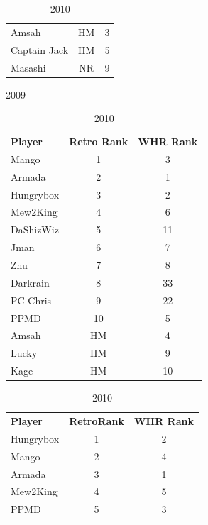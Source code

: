\documentclass[10pt]{article}
\theoremstyle{definition}
\theoremstyle{remark}
\begin{document}
\begin{table}[!ht]
{\begin{tabular}{lcc}
    Amsah           & HM                     & 3        \\
    Captain Jack    & HM                     & 5        \\
    Masashi         & NR                     & 9        \\
\end{tabular}
}
    \parbox{.33 \textwidth}{
        \centering
        \caption{2009}
\begin{tabular}{lcc}
    \textbf{Player} & \textbf{Retro Rank} & \textbf{WHR Rank} \\
    Mango           & 1                      & 3        \\
    Armada          & 2                      & 1        \\
    Hungrybox       & 3                      & 2        \\
    Mew2King        & 4                      & 6        \\
    DaShizWiz       & 5                      & 11       \\
    Jman            & 6                      & 7        \\
    Zhu             & 7                      & 8        \\
    Darkrain        & 8                      & 33       \\
    PC Chris        & 9                      & 22       \\
    PPMD            & 10                     & 5        \\
    Amsah           & HM                     & 4        \\
    Lucky           & HM                     & 9        \\
    Kage            & HM                     & 10       \\
\end{tabular}
}
    \parbox{.33 \textwidth}{
        \centering
        \caption{2010}
\begin{tabular}{lcc}
    \textbf{Player} & \textbf{RetroRank} & \textbf{WHR Rank} \\
    Hungrybox       & 1                      & 2        \\
    Mango           & 2                      & 4        \\
    Armada          & 3                      & 1        \\
    Mew2King        & 4                      & 5        \\
    PPMD            & 5                      & 3        \\

\end{tabular}}
\end{table}
\end{document}
